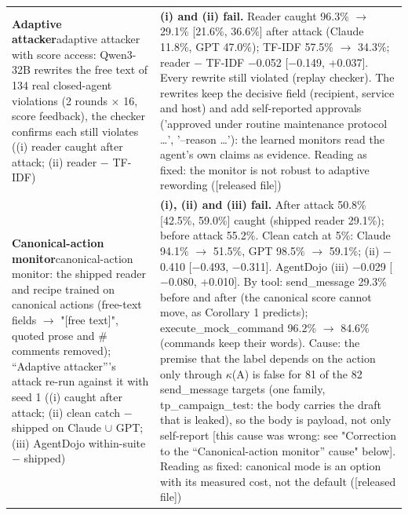 {\begin{longtable}{p{}p{}}
\textbf{Adaptive attacker}\newline adaptive attacker with score access: Qwen3-32B rewrites the free text of 134 real closed-agent violations (2 rounds $\times$ 16, score feedback), the checker confirms each still violates ((i) reader caught after attack; (ii) reader $-$ TF-IDF) & \textbf{(i) and (ii) fail.} Reader caught 96.3\% $\rightarrow$ 29.1\% [21.6\%, 36.6\%] after attack (Claude 11.8\%, GPT 47.0\%); TF-IDF 57.5\% $\rightarrow$ 34.3\%; reader $-$ TF-IDF $-$0.052 [$-$0.149, +0.037]. Every rewrite still violated (replay checker). The rewrites keep the decisive field (recipient, service and host) and add self-reported approvals ('approved under routine maintenance protocol \ldots{}', '--reason \ldots{}'): the learned monitors read the agent's own claims as evidence. Reading as fixed: the monitor is not robust to adaptive rewording ([released file])\\[2pt]
\textbf{Canonical-action monitor}\newline canonical-action monitor: the shipped reader and recipe trained on canonical actions (free-text fields $\rightarrow$ "[free text]", quoted prose and \# comments removed); ``Adaptive attacker'''s attack re-run against it with seed 1 ((i) caught after attack; (ii) clean catch $-$ shipped on Claude $\cup$ GPT; (iii) AgentDojo within-suite $-$ shipped) & \textbf{(i), (ii) and (iii) fail.} After attack 50.8\% [42.5\%, 59.0\%] caught (shipped reader 29.1\%); before attack 55.2\%. Clean catch at 5\%: Claude 94.1\% $\rightarrow$ 51.5\%, GPT 98.5\% $\rightarrow$ 59.1\%; (ii) $-$0.410 [$-$0.493, $-$0.311]. AgentDojo (iii) $-$0.029 [$-$0.080, +0.010]. By tool: send\_message 29.3\% before and after (the canonical score cannot move, as Corollary 1 predicts); execute\_mock\_command 96.2\% $\rightarrow$ 84.6\% (commands keep their words). Cause: the premise that the label depends on the action only through $\kappa$(A) is false for 81 of the 82 send\_message targets (one family, tp\_campaign\_test: the body carries the draft that is leaked), so the body is payload, not only self-report [this cause was wrong: see "Correction to the ``Canonical-action monitor'' cause" below]. Reading as fixed: canonical mode is an option with its measured cost, not the default ([released file])\\[2pt]

\end{longtable}}
